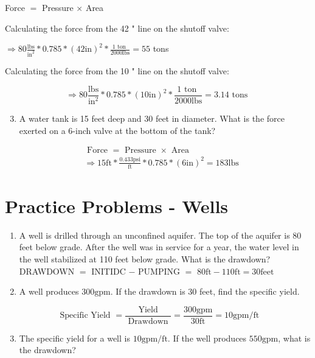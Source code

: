 \documentclass[10pt]{article}
\begin{document}
\begin{enumerate}
\begin{enumerate}
Force $=$ Pressure $\times$ Area

Calculating the force from the 42 " line on the shutoff valve:

$\Longrightarrow 80 \frac{\mathrm{lbs}}{\mathrm{in}^{2}} * 0.785 *(42 \mathrm{in})^{2} * \frac{1 \text { ton }}{2000 \mathrm{lbs}}=55$ tons

Calculating the force from the 10 " line on the shutoff valve:

$$
\Longrightarrow 80 \frac{\mathrm{lbs}}{\mathrm{in}^{2}} * 0.785 *(10 \mathrm{in})^{2} * \frac{1 \text { ton }}{2000 \mathrm{lbs}}=3.14 \text { tons }
$$

\begin{enumerate}
  \setcounter{enumi}{2}
  \item A water tank is 15 feet deep and 30 feet in diameter. What is the force exerted on a 6-inch valve at the bottom of the tank?
\end{enumerate}

$$
\begin{aligned}
& \text { Force }=\text { Pressure } \times \text { Area } \\
& \Longrightarrow 15 \mathrm{ft} * \frac{0.433 \mathrm{psi}}{\mathrm{ft}} * 0.785 *(6 \mathrm{in})^{2}=183 \mathrm{lbs}
\end{aligned}
$$

\section{Practice Problems - Wells}
\begin{enumerate}
  \item A well is drilled through an unconfined aquifer. The top of the aquifer is 80 feet below grade. After the well was in service for a year, the water level in the well stabilized at 110 feet below grade. What is the drawdown? DRAWDOWN $=$ INITIDC $-$ PUMPING $=$ $80 \mathrm{ft}-110 \mathrm{ft}=30 \mathrm{feet}$

  \item A well produces $300 \mathrm{gpm}$. If the drawdown is 30 feet, find the specific yield.

\end{enumerate}

$$
\text { Specific Yield }=\frac{\text { Yield }}{\text { Drawdown }}=\frac{300 \mathrm{gpm}}{30 \mathrm{ft}}=10 \mathrm{gpm} / \mathrm{ft}
$$

\begin{enumerate}
  \setcounter{enumi}{2}
  \item The specific yield for a well is $10 \mathrm{gpm} / \mathrm{ft}$. If the well produces $550 \mathrm{gpm}$, what is the drawdown?
\end{enumerate}


\end{enumerate}
\end{enumerate}
\end{document}
